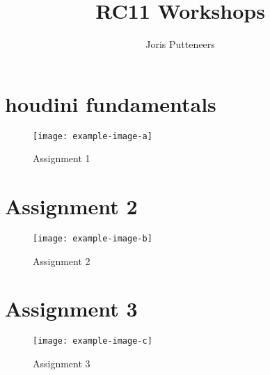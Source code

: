 \documentclass[11pt, a4paper, twoside]{article}
\begin{document}
\title{RC11 Workshops}
\author{Joris Putteneers}
\date{}
\maketitle



\section*{houdini fundamentals}
\lipsum[1-4]
\begin{figure}[h]
  \centering
  \texttt{[image: example-image-a]}
  \caption{Assignment 1}
  \label{fig:assignment1}
\end{figure}

\lipsum[1-4]



\section*{Assignment 2}
\begin{figure}[h]
  \centering
  \texttt{[image: example-image-b]}
  \caption{Assignment 2}
  \label{fig:assignment2}
\end{figure}

\section*{Assignment 3}
\begin{figure}[h]
  \centering
  \texttt{[image: example-image-c]}
  \caption{Assignment 3}
  \label{fig:assignment3}
\end{figure}
\end{document}
